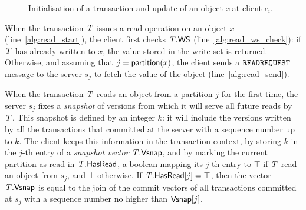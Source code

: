 \begin{figure}[h]
\begin{algorithm}[H]
  \setcounter{AlgoLine}{0}

  \smallskip

\end{algorithm}
\caption{
  Initialisation of a transaction and update of an object \emph{x} at client $c_i$.
}
\label{fig:client-init-write}
\end{figure}

When the transaction $\mathit{T}$ issues a read operation on an object $x$ (line~\ref{alg:read_start}), the client first checks $\mathit{T}.\mathsf{WS}$ (line~\ref{alg:read_ws_check}): if $\mathit{T}$ has already written to $x$, the value stored in the write-set is returned. Otherwise, and assuming that $j = \mathsf{partition}(x)$, the client sends a ${\tt READREQUEST}$ message to the server $s_j$ to fetch the value of the object (line~\ref{alg:read_send}).

When the transaction $\mathit{T}$ reads an object from a partition $j$ for the first time, the server $s_j$ fixes a \emph{snapshot} of versions from which it will serve all future reads by $\mathit{T}$. This snapshot is defined by an integer $k$: it will include the versions written by all the transactions that committed at the server with a sequence number up to $k$. The client keeps this information in the transaction context, by storing $k$ in the $j$-th entry of a \emph{snapshot vector} $\mathit{T}.\mathsf{Vsnap}$, and by marking the current partition as read in $\mathit{T}.\mathsf{HasRead}$, a boolean mapping its $j$-th entry to $\top$ if $\mathit{T}$ read an object from $s_j$, and $\bot$ otherwise. If $\mathit{T}.\mathsf{HasRead}[j]=\top$, then the vector $\mathit{T}.\mathsf{Vsnap}$ is equal to the join of the commit vectors of all transactions committed at $s_j$ with a sequence number no higher than $\mathsf{Vsnap}[j]$.

